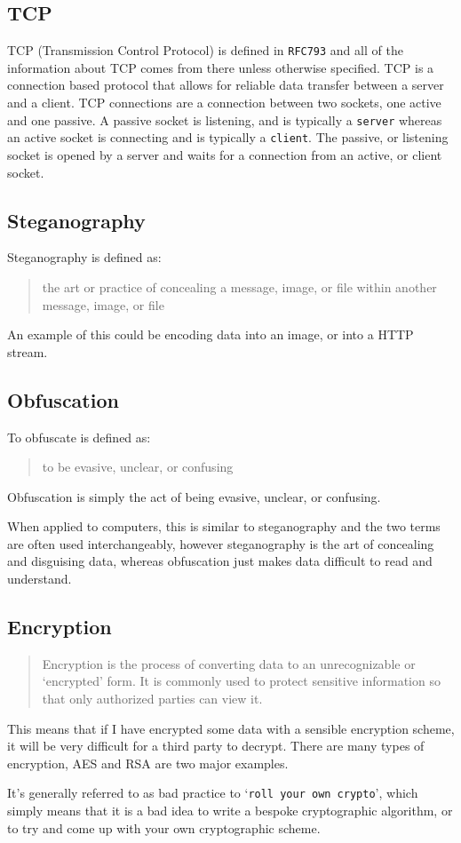 \subsection{TCP}
TCP (Transmission Control Protocol) is defined in \texttt{RFC793}\cite{rfc793} and all of the information about TCP comes from there unless otherwise specified.
TCP is a connection based protocol that allows for reliable data transfer between a server and a client.
TCP connections are a connection between two sockets, one active and one passive.
A passive socket is listening, and is typically a \texttt{server} whereas an active socket is connecting and is typically a \texttt{client}.
The passive, or listening socket is opened by a server and waits for a connection from an active, or client socket.

\subsection{Steganography}
Steganography is defined as\cite{dictsteno}:
\begin{quotation}
    the art or practice of concealing a message, image, or file within
    another message, image, or file
\end{quotation}
An example of this could be encoding data into an image, or into a HTTP stream.

\subsection{Obfuscation}
To obfuscate is defined as\cite{dictobfs}:
\begin{quotation}
     to be evasive, unclear, or confusing
\end{quotation}
Obfuscation is simply the act of being evasive, unclear, or confusing.\par
When applied to computers, this is similar to steganography and the two terms are often used interchangeably, however steganography is the art of concealing and disguising data, whereas obfuscation just makes data difficult to read and understand. 

\subsection{Encryption}
\begin{quotation}
    Encryption is the process of converting data to an unrecognizable or
    `encrypted' form. It is commonly used to protect sensitive
    information so that only authorized parties can view it\cite{dictenc}.
\end{quotation}
This means that if I have encrypted some data with a sensible encryption scheme, it will be very difficult for a third party to decrypt.
There are many types of encryption, AES and RSA are two major examples.\par
It's generally referred to as bad practice to `\texttt{roll your own crypto}'\cite{memtocrypto}, which simply means that it is a bad idea to write a bespoke cryptographic algorithm, or to try and come up with your own cryptographic scheme.

